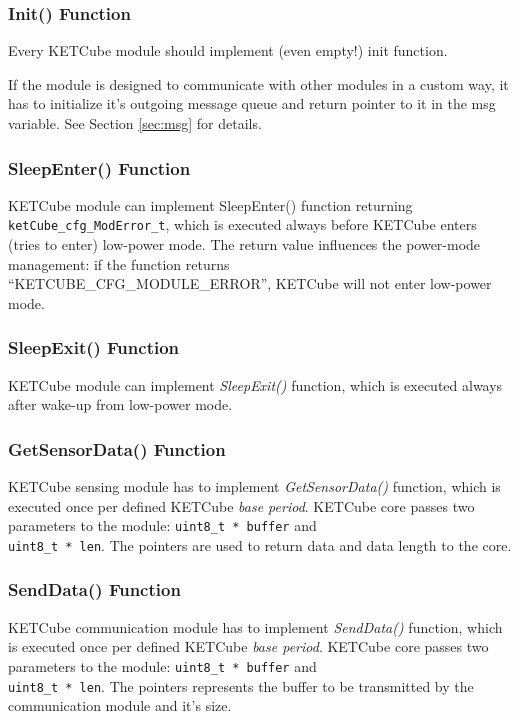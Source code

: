 \subsubsection*{Init() Function}
Every KETCube module should implement (even empty!) init function.

If the module is designed to communicate with other modules in a custom way, it has to initialize it's outgoing message queue and return pointer to it in the msg variable. See Section \ref{sec:msg} for details.


\subsubsection*{SleepEnter() Function}
KETCube module can implement SleepEnter() function returning\\{\tt ketCube\_cfg\_ModError\_t}, which is executed always before KETCube enters (tries to enter) low-power mode. The return value influences the power-mode management: if the function returns\\“KETCUBE\_CFG\_MODULE\_ERROR”, KETCube will not enter low-power mode.

\subsubsection*{SleepExit() Function}
KETCube module can implement {\it SleepExit()} function, which is executed always after wake-up from low-power mode.

\subsubsection*{GetSensorData() Function}
KETCube sensing module has to implement {\it GetSensorData()} function, which is executed once per defined KETCube {\it base period}. KETCube core passes two parameters to the module: {\tt uint8\_t * buffer} and\\{\tt uint8\_t * len}. The pointers are used to return data and data length to the core.


\subsubsection*{SendData() Function}
KETCube communication module has to implement {\it SendData()} function, which is executed once per defined KETCube {\it base period}. KETCube core passes two parameters to the module: {\tt uint8\_t * buffer} and\\{\tt uint8\_t * len}. The pointers represents the buffer to be transmitted by the communication module and it's size.

